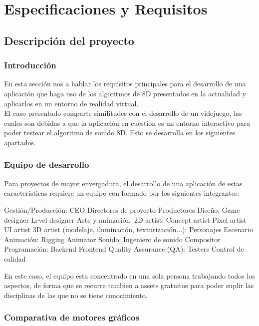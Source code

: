 \section{Especificaciones y Requisitos}

\subsection{Descripción del proyecto}
\subsubsection{Introducción}
\quad En esta sección nos a hablar los requisitos principales para el desarrollo de una aplicación que haga uso de los algoritmos de 8D presentados en la actualidad y aplicarlos en un entorno de realidad virtual.\\ 

\quad El caso presentado comparte similitudes con el desarrollo de un videjuego, las cuales son debidas a que la aplicación en cuestion es un entorno interactivo para poder testear el algoritmo de sonido 8D. Esto se desarrolla en los siguientes apartados.

\subsubsection{Equipo de desarrollo}
\quad Para proyectos de mayor envergadura, el desarrollo de una aplicación de estas características requiere un equipo con formado por los siguientes integrantes:\\
\begin{outline}
\1 Gestión/Producción:
	\2 CEO
	\2 Directores de proyecto
	\2 Productores	
\1 Diseño:
	\2 Game designer
	\2 Level designer
\1 Arte y animación:
	\2 2D artist:
		\3 Concept artist
		\3 Pixel artist
		\3 UI artist
	\2 3D artist (modelaje, iluminación, texturización...):
		\3 Personajes
		\3 Escenario
\1 Animación:
	\2 Rigging
	\2 Animator
\1 Sonido:
	\2 Ingeniero de sonido
	\2 Compositor
\1 Programación:
	\2 Backend
	\2 Frontend
\1 Quality Assurance (QA):
	\2 Testers
	\2 Control de calidad 
\end{outline}

\quad En este caso, el equipo esta concentrado en una sola persona trabajando todos los aspectos, de forma que se recurre tambien a assets gratuitos para poder suplir las disciplinas de las que no se tiene conocimiento.\\ 

\subsubsection{Comparativa de motores gráficos}

